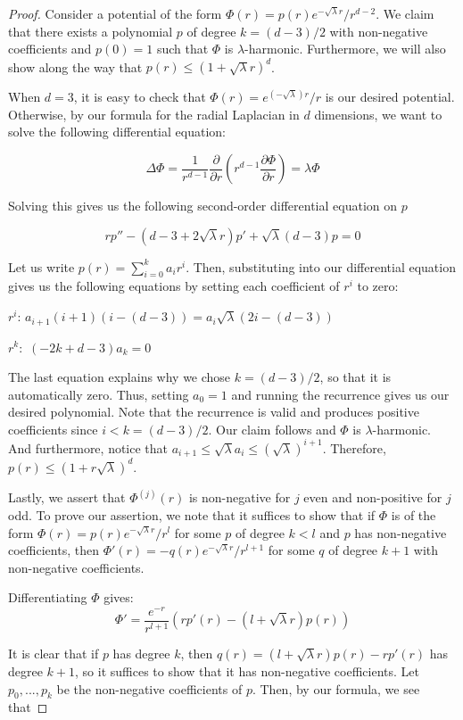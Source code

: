 \begin{proof}
Consider a potential of the form $\Phi(r) = p(r)e^{-\sqrt{\lambda}r}/r^{d-2}$. We claim that there exists a polynomial $p$ of degree $k = (d-3)/2$ with non-negative coefficients and $p(0) = 1$ such that $\Phi$ is $\lambda$-harmonic. Furthermore, we will also show along the way that $p(r) \leq (1+\sqrt{\lambda}r)^d$.

When $d = 3$, it is easy to check that $\Phi(r) = e^{(-\sqrt{\lambda})r}/r$ is our desired potential. Otherwise, by our formula for the radial Laplacian in $d$ dimensions, we want to solve the following differential equation:

\[\Delta \Phi =  \frac{1}{r^{d-1}} \frac{\partial}{\partial r} (r^{d-1} \frac{\partial \Phi}{\partial r}) =\lambda \Phi\]

Solving this gives us the following second-order differential equation on $p$

\[rp'' - (d-3+2\sqrt{\lambda}r)p' +\sqrt{\lambda} (d-3)p = 0\]

Let us write $p(r) = \sum_{i=0}^k a_i r^i$. Then, substituting into our differential equation gives us the following equations by setting each coefficient of $r^i$ to zero:

$r^i$:  $a_{i+1}(i+1)(i - (d-3)) = a_i \sqrt{\lambda} (2i-(d-3))$

$r^k:$ $(-2k +d-3)a_k = 0$

The last equation explains why we chose $k = (d-3)/2$, so that it is automatically zero. Thus, setting $a_0 = 1$ and running the recurrence gives us our desired polynomial. Note that the recurrence is valid and produces positive coefficients since $i < k  = (d-3)/2$. Our claim follows and $\Phi$ is $\lambda$-harmonic. And furthermore, notice that $a_{i+1} \leq \sqrt{\lambda} a_i \leq (\sqrt{\lambda})^{i+1}$. Therefore, $p(r) \leq (1+r\sqrt{\lambda})^d$. 

Lastly, we assert that $\Phi^{(j)}(r)$ is non-negative for $j$ even and non-positive for $j$ odd. To prove our assertion, we note that it suffices to show that if $\Phi$ is of the form $\Phi(r) = p(r) e^{-\sqrt{\lambda}r}/r^{l}$ for some $p$ of degree $k < l$ and $p$ has non-negative coefficients, then $\Phi'(r) = - q(r) e^{-\sqrt{\lambda}r}/r^{l+1}$ for some $q$ of degree $k+1$ with non-negative coefficients. 

Differentiating $\Phi$ gives:
%
\[\Phi' = \frac{e^{-r}}{r^{l+1}} (rp'(r) - (l + \sqrt{\lambda} r)p(r))\]

It is clear that if $p$ has degree $k$, then $q(r) = (l+\sqrt{\lambda} r)p(r) - rp'(r)$ has degree $k+1$, so it suffices to show that it has non-negative coefficients. Let $p_0,..., p_k$ be the non-negative coefficients of $p$. Then, by our formula, we see that 


\end{proof}
